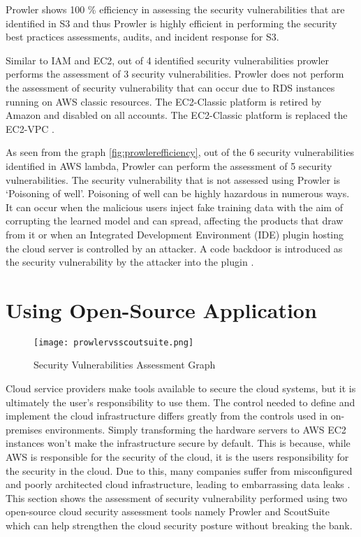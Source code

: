 \par Prowler shows 100 \% efficiency in assessing the security vulnerabilities that are identified in S3 and thus Prowler is highly efficient in performing the security best practices assessments, audits, and incident response for S3.

\par Similar to IAM and EC2, out of 4 identified security
vulnerabilities prowler performs the assessment of 3 security vulnerabilities.
Prowler does not perform the assessment of security vulnerability that can occur due to RDS instances running on AWS classic resources.
The EC2-Classic platform is retired by Amazon and disabled on all accounts.
The EC2-Classic platform is replaced the EC2-VPC \cite{88}.

\par As seen from the graph \ref{fig:prowlerefficiency}, out of the 6 security vulnerabilities identified in AWS lambda, Prowler can perform the assessment of 5 security vulnerabilities.
The security vulnerability that is not assessed using Prowler is ‘Poisoning of well’.
Poisoning of well can be highly hazardous in numerous ways.
It can occur when the malicious users inject fake
training
data with the aim of corrupting the learned model and can
spread, affecting the products that draw from it or when
an Integrated Development Environment (IDE) plugin hosting the cloud server is controlled by an attacker.
A code backdoor is introduced as the security vulnerability by the attacker into the plugin \cite{89}.


\section{Using Open-Source Application}

\begin{figure}
    \centering
    \texttt{[image: prowlervsscoutsuite.png]}
    \caption{Security Vulnerabilities Assessment Graph}
    \label{fig:prowlervsscoutsuite}
\end{figure}

\par Cloud service providers make tools available to secure the cloud systems, but it is ultimately the user’s responsibility to use them.
The control needed to define and implement the cloud infrastructure differs greatly from the controls used in on-premises environments.
Simply transforming the hardware servers to AWS EC2 instances won't make the infrastructure secure by default.
This is because, while AWS is responsible for the
security of the cloud, it is the users responsibility
for the security in the cloud.
Due to this, many companies suffer from misconfigured and poorly architected cloud infrastructure, leading to embarrassing data leaks \cite{74}.
This section shows the assessment of security vulnerability performed using two open-source cloud security assessment tools namely Prowler and ScoutSuite which can help strengthen the cloud security posture without breaking the bank.

